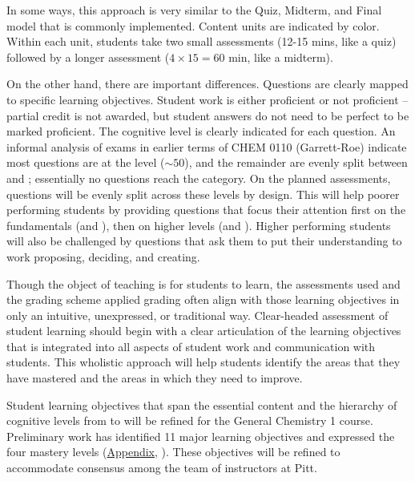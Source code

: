 \documentclass[10pt,letterpaper]{article}
\begin{document}
In some ways, this approach is very similar to the Quiz, Midterm, and Final model that is commonly implemented. Content units are indicated by color. Within each unit, students take two small assessments (12-15 mins, like a quiz) followed by a longer assessment ($4\times15=60$ min, like a midterm). 

On the other hand, there are important differences. Questions are clearly mapped to specific learning objectives. Student work is either proficient or not proficient -- partial credit is not awarded, but student answers do not need to be perfect to be marked proficient. The cognitive level is clearly indicated for each question. An informal analysis of exams in earlier terms of CHEM 0110 (Garrett-Roe) indicate most questions are at the \analysis level ($\sim50$), and the remainder are evenly split between \recall and \comprehension; essentially no questions reach the \use category. On the planned assessments, questions will be evenly split across these levels by design. This will help poorer performing students by providing questions that focus their attention first on the fundamentals (\recall and \comprehension), then on higher levels (\analysis and \use). Higher performing students will also be challenged by \use questions that ask them to put their understanding to work proposing, deciding, and creating.

%
%
Though the object of teaching is for students to learn,  the assessments used and the grading scheme applied grading often align with those learning objectives in only an intuitive, unexpressed, or traditional way. Clear-headed assessment of student learning should begin with a clear articulation of the learning objectives that is integrated into all aspects of student work and communication with students. This wholistic approach will help students identify the areas that they have mastered and the areas in which  they need to improve.

Student learning objectives that span the essential content and the hierarchy of cognitive levels from \recall to \use will be refined for the General Chemistry 1 course. Preliminary work has identified 11 major learning objectives and expressed the four mastery levels (\hyperref[app:learning_objectives]{Appendix}, ). These objectives will be refined to accommodate consensus among the team of \pogil instructors at Pitt. 
\end{document}
